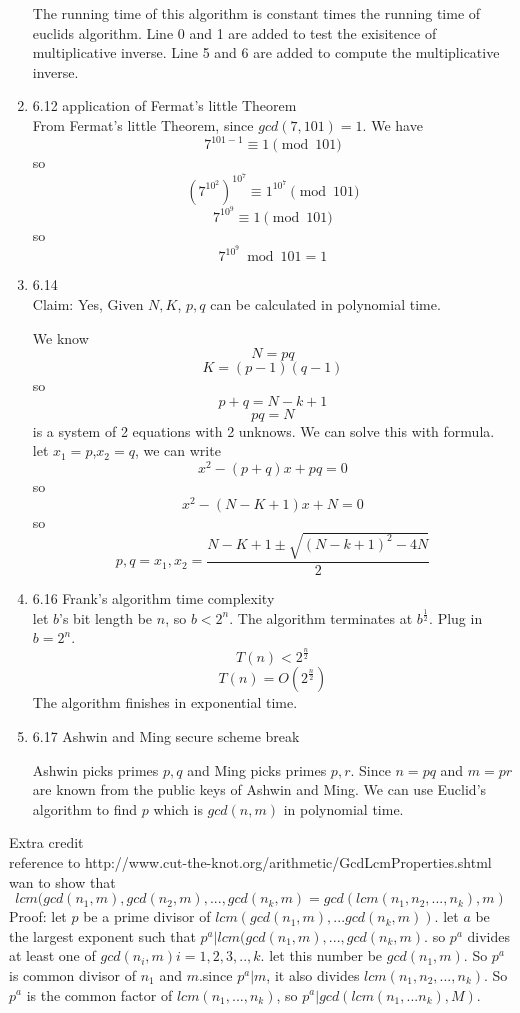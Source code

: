 \documentclass[11pt]{article}
\begin{document}
\begin{enumerate}
\begin{tabbing}
\end{tabbing}

The running time of this algorithm is constant times the running time of euclids algorithm. Line 0 and 1 are added to test the exisitence of multiplicative inverse. Line 5 and 6 are added to compute the multiplicative inverse.  

\item 6.12 application of Fermat's little Theorem\\
From Fermat's little Theorem, since $gcd(7,101) = 1$. We have
\[ 7^{101-1} \equiv 1 \pmod{101}\]
so \[ (7^{10^2})^{10^7} \equiv 1^{10^7} \pmod{101}\]
\[7^{10^9} \equiv 1 \pmod{101}\]
so\[7^{10^9} \bmod 101 = 1\]

\item 6.14\\
Claim: Yes, Given $N,K$, $p,q$ can be calculated in polynomial time.

We know \[ N=pq\]
\[K=(p-1)(q-1)\]
so
\[p+q =N-k+1\]
\[pq=N\]
is a system of 2 equations with 2 unknows. We can solve this with formula.\\
let $x_1=p$,$x_2=q$, we can write \[x^2-(p+q)x+pq=0\]
so \[x^2-(N-K+1)x+N=0\]
so\[p,q = x_1,x_2 = \frac{N-K+1 \pm \sqrt{(N-k+1)^2-4N}}{2} \]





\item 6.16 Frank's algorithm time complexity\\
let $b$'s bit length be $n$, so $b < 2^n$. The algorithm terminates at $b^{\frac{1}{2}}$. Plug in $b = 2^n$.
\[ T(n) < 2^{\frac{n}{2}}\]
\[ T(n) = O(2^{\frac{n}{2}})\]
The algorithm finishes in exponential time.


\item 6.17 Ashwin and Ming secure scheme break

Ashwin picks primes $p,q$ and Ming picks primes $p,r$.
Since $n = pq$ and $m = pr$ are known from the public keys of Ashwin and Ming. We can use Euclid's algorithm to find $p$ which is $gcd(n,m)$ in polynomial time. 

\end{enumerate}

\pagebreak
Extra credit\\ reference to http://www.cut-the-knot.org/arithmetic/GcdLcmProperties.shtml
wan to show that \[lcm(gcd(n_1,m),gcd(n_2,m),...,gcd(n_k,m) = gcd(lcm(n_1,n_2,...,n_k),m)\]
Proof:
let $p$ be a prime divisor of $lcm(gcd(n_1,m),...gcd(n_k,m))$. let $a$ be the largest exponent such that $p^a|lcm(gcd(n_1,m),...,gcd(n_k,m)$. so $p^a$ divides at least one of $gcd(n_i,m) i =1,2,3,..,k$. let this number be $gcd(n_1,m)$. So $p^a$ is common divisor of $n_1$ and $m$.since $p^a|m$, it also divides $lcm(n_1,n_2,...,n_k)$. So $p^a$ is the common factor of $lcm(n_1,...,n_k)$, so $p^a|gcd(lcm(n_1,...n_k),M)$.
\end{document}
